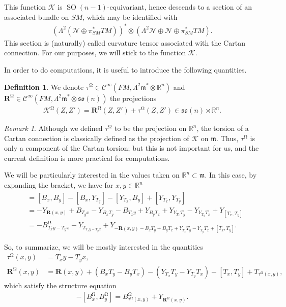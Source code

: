 \documentclass[12pt]{amsart}
\numberwithin{numbering}{section}
\theoremstyle{plain}
\theoremstyle{definition}
\newtheorem{df}[numbering]{Definition}
\theoremstyle{remark}
\newtheorem{rmq}[numbering]{Remark}
\numberwithin{equation}{section}
\DeclareMathOperator{\SO}{SO}
\DeclareMathOperator{\mg}{\Omega}
\newcommand{\psm}{\pi_{SM}}
\newcommand{\rfm}{\mathbf{R}}
\newcommand{\rsfm}{\mathbf{R}^{\mg}}
\newcommand{\con}[1]{T_{#1}}
\newcommand{\R}{\mathbb{R}}
\newcommand{\frk}[1]{\mathfrak{#1}}
\begin{document}
This function $\mathscr{K}$ is $\SO(n-1)$-equivariant, hence descends to a section of an associated bundle on $SM$, which may be identified with
\begin{align*}
(\Lambda^2 (\mathcal{N} \oplus \psm^* TM))^* \otimes (\Lambda^2 \mathcal{N} \oplus \mathcal{N} \oplus \psm^* TM).
\end{align*}
This section is (naturally) called curvature tensor associated with the Cartan connection. For our purposes, we will stick to the function $\mathscr{K}$.

In order to do computations, it is useful to introduce the following quantities.

\begin{df}
We denote $\tau^{\mg} \in \mathcal{C}^\infty(FM, \Lambda^2 \frk{m}^* \otimes \R^n)$ and $\rsfm \in \mathcal{C}^\infty(FM, \Lambda^2 \frk{m}^* \otimes \frk{so}(n))$ the projections
\begin{align}
\mathscr{K}^{\mg}(Z, Z') = \rsfm(Z, Z') + \tau^{\mg}(Z, Z') \in \frk{so}(n) \rtimes \R^n.
\end{align}
\end{df}

\begin{rmq}
Although we defined $\tau^{\mg}$ to be the projection on $\R^n$, the torsion of a Cartan connection is classically defined as the projection of $\mathscr{K}$ on $\frk{m}$. Thus, $\tau^{\mg}$ is only a component of the Cartan torsion; but this is not important for us, and the current definition is more practical for computations.
\end{rmq}

We will be particularly interested in the values taken on $\R^n \subset \frk{m}$. In this case, by expanding the bracket, we have for $x, y \in \R^n$
\begin{align*}
[B^{\mg}_x, B^{\mg}_y]
&= [B_x, B_y] - [B_x, Y_{T_{y}}] - [Y_{T_{x}}, B_y] + [Y_{T_{x}}, Y_{T_{y}}] \\ 
&= - Y_{\rfm(x, y)} + B_{T_{y} x} - Y_{B_x T_{y}} - B_{T_{x} y} + Y_{B_y T_{x}} + Y_{Y_{T_{x}} T_{y}} - Y_{Y_{T_{y}} T_{x}} + Y_{[T_{x}, T_{y}]} \\ 
&= - B^{\mg}_{T_{x} y - T_{y} x} - Y_{T_{T_{x} y - T_{y} x}} + Y_{-\rfm(x, y) - B_x T_{y} + B_y T_{x} + Y_{T_{x}} T_{y} - Y_{T_{y}} T_{x} + [T_{x}, T_{y}]}.
\end{align*}

\smallskip

So, to summarize, we will be mostly interested in the quantities
\begin{align} \label{eq:def_torsion}
\tau^{\mg}(x, y) &= \con{x} y - \con{y} x, \\ 
\label{eq:def_curv}
\rsfm(x, y) &= \rfm(x, y) + (B_x \con{y} - B_y \con{x}) - (Y_{\con{x}} \con{y} - Y_{\con{y}} \con{x}) - [\con{x}, \con{y}] + \con{\tau^{\mg}(x, y)},
\end{align}
which satisfy the structure equation 
\begin{align}
- [B^{\mg}_x, B^{\mg}_y] = B^{\mg}_{\tau^{\mg}(x, y)} + Y_{\rsfm(x, y)}. \label{eq:struct_mag}
\end{align}
\end{document}
